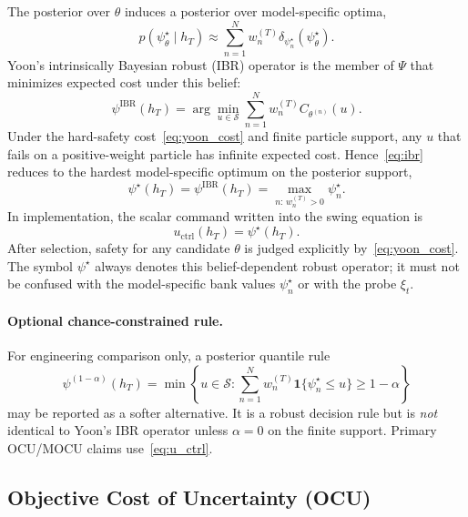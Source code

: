\documentclass[11pt]{article}
\begin{document}
The posterior over \(\theta\) induces a posterior over model-specific optima,
\[
\boxed{
p(\psi_\theta^\star\mid h_T)
\approx
\sum_{n=1}^{N}
w_n^{(T)}
\delta_{\psi_n^\star}(\psi_\theta^\star).
}
\label{eq:control_posterior}
\]
Yoon's intrinsically Bayesian robust (IBR) operator is the member of \(\Psi\)
that minimizes expected cost under this belief:
\[
\boxed{
\psi^{\mathrm{IBR}}(h_T)
=
\arg\min_{u\in\mathcal S}
\sum_{n=1}^{N}
w_n^{(T)}
C_{\theta^{(n)}}(u).
}
\label{eq:ibr}
\]
Under the hard-safety cost~\eqref{eq:yoon_cost} and finite particle support,
any \(u\) that fails on a positive-weight particle has infinite expected cost.
Hence~\eqref{eq:ibr} reduces to the hardest model-specific optimum on the
posterior support,
\[
\boxed{
\psi^\star(h_T)
=
\psi^{\mathrm{IBR}}(h_T)
=
\max_{n:\,w_n^{(T)}>0}\psi_n^\star.
}
\label{eq:u_ctrl}
\]
In implementation, the scalar command written into the swing equation is
\[
u_{\mathrm{ctrl}}(h_T)=\psi^\star(h_T).
\]
After selection, safety for any candidate \(\theta\) is judged explicitly
by~\eqref{eq:yoon_cost}. The symbol \(\psi^\star\) always denotes this
belief-dependent robust operator; it must not be confused with the
model-specific bank values \(\psi_n^\star\) or with the probe \(\xi_t\).

\paragraph{Optional chance-constrained rule.}
For engineering comparison only, a posterior quantile rule
\[
\psi^{(1-\alpha)}(h_T)
=
\min
\left\{
u\in\mathcal S:
\sum_{n=1}^{N}
w_n^{(T)}
\mathbf 1\{\psi_n^\star\le u\}
\ge 1-\alpha
\right\}
\]
may be reported as a softer alternative. It is a robust decision rule but is
\emph{not} identical to Yoon's IBR operator unless \(\alpha=0\) on the
finite support. Primary OCU/MOCU claims use~\eqref{eq:u_ctrl}.

\subsection{Objective Cost of Uncertainty (OCU)}
\end{document}
